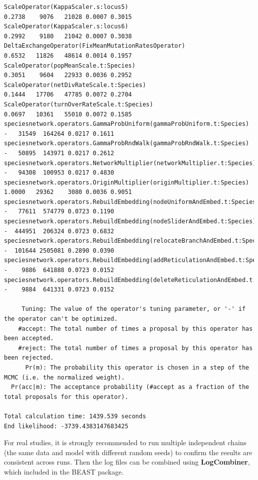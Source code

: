 \documentclass[11pt]{article}
\begin{document}
{\begin{verbatim}
ScaleOperator(KappaScaler.s:locus5)                                        0.2738    9076   21028 0.0007 0.3015 
ScaleOperator(KappaScaler.s:locus6)                                        0.2992    9180   21042 0.0007 0.3038 
DeltaExchangeOperator(FixMeanMutationRatesOperator)                        0.6532   11826   48614 0.0014 0.1957 
ScaleOperator(popMeanScale.t:Species)                                      0.3051    9604   22933 0.0036 0.2952 
ScaleOperator(netDivRateScale.t:Species)                                   0.1444   17706   47785 0.0072 0.2704 
ScaleOperator(turnOverRateScale.t:Species)                                 0.0697   10361   55010 0.0072 0.1585 
speciesnetwork.operators.GammaProbUniform(gammaProbUniform.t:Species)           -   31549  164264 0.0217 0.1611 
speciesnetwork.operators.GammaProbRndWalk(gammaProbRndWalk.t:Species)           -   50895  143971 0.0217 0.2612 
speciesnetwork.operators.NetworkMultiplier(networkMultiplier.t:Species)         -   94308  100953 0.0217 0.4830 
speciesnetwork.operators.OriginMultiplier(originMultiplier.t:Species)      1.0000   29362    3080 0.0036 0.9051 
speciesnetwork.operators.RebuildEmbedding(nodeUniformAndEmbed.t:Species)        -   77611  574779 0.0723 0.1190 
speciesnetwork.operators.RebuildEmbedding(nodeSliderAndEmbed.t:Species)         -  444951  206324 0.0723 0.6832 
speciesnetwork.operators.RebuildEmbedding(relocateBranchAndEmbed.t:Species)     -  101644 2505081 0.2890 0.0390 
speciesnetwork.operators.RebuildEmbedding(addReticulationAndEmbed.t:Species)    -    9886  641888 0.0723 0.0152 
speciesnetwork.operators.RebuildEmbedding(deleteReticulationAndEmbed.t:Species) -    9884  641331 0.0723 0.0152 

     Tuning: The value of the operator's tuning parameter, or '-' if the operator can't be optimized.
    #accept: The total number of times a proposal by this operator has been accepted.
    #reject: The total number of times a proposal by this operator has been rejected.
      Pr(m): The probability this operator is chosen in a step of the MCMC (i.e. the normalized weight).
  Pr(acc|m): The acceptance probability (#accept as a fraction of the total proposals for this operator).

Total calculation time: 1439.539 seconds
End likelihood: -3739.4383147683425
\end{verbatim}}

For real studies, it is strongly recommended to run multiple independent chains (the same data and model with different random seeds) to confirm the results are consistent across runs. Then the log files can be combined using \textbf{LogCombiner}, which included in the BEAST package.
\end{document}
